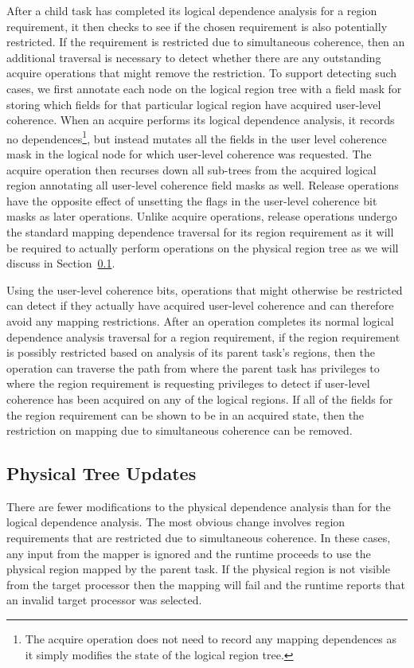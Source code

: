 After a child task has completed its logical 
dependence analysis for a region requirement, it
then checks to see if the chosen requirement is
also potentially restricted. If the requirement
is restricted due to simultaneous coherence, then an
additional traversal is necessary to detect
whether there are any outstanding acquire
operations that might remove the restriction.
To support detecting such cases, we first 
annotate each node on the logical region tree
with a field mask for storing which fields
for that particular logical region have 
acquired user-level coherence. When an 
acquire performs its logical dependence analysis, 
it records no dependences\footnote{The acquire operation
does not need to record any mapping dependences
as it simply modifies the state of the logical
region tree.}, but instead mutates 
all the fields in the user level coherence mask 
in the logical node for which user-level coherence 
was requested. The acquire operation then recurses
down all sub-trees from the acquired logical region
annotating all user-level coherence field masks
as well. Release operations have the 
opposite effect of unsetting the flags in the
user-level coherence bit masks as later operations.
Unlike acquire operations, release operations 
undergo the standard mapping dependence traversal
for its region requirement as it will be required
to actually perform operations on the physical
region tree as we will discuss in 
Section~\ref{subsec:physicalupdates}.

Using the user-level coherence bits, operations
that might otherwise be restricted can detect
if they actually have acquired user-level coherence
and can therefore avoid any mapping restrictions.
After an operation completes its normal logical
dependence analysis traversal for a region 
requirement, if the region requirement 
is possibly restricted based on analysis of its
parent task's regions, then the operation can 
traverse the path from where the parent task
has privileges to where the region requirement
is requesting privileges to detect if
user-level coherence has been acquired on 
any of the logical regions. If all of the fields
for the region requirement can be shown to 
be in an acquired state, then the restriction
on mapping due to simultaneous coherence can
be removed.

\subsection{Physical Tree Updates}
\label{subsec:physicalupdates}
There are fewer modifications to the physical
dependence analysis than for the logical 
dependence analysis. The most obvious change
involves region requirements that are restricted
due to simultaneous coherence. In these cases,
any input from the mapper is ignored and the 
runtime proceeds to use the physical region 
mapped by the parent task. If the physical region
is not visible from the target processor then 
the mapping will fail and the runtime reports 
that an invalid target processor was selected.

